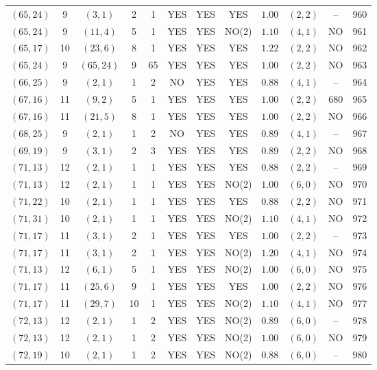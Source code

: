 \begin{longtable}{|c|c|c|c|c|c|c|c|c|c|c|c|}
$(65,24)$ & 9 & $(3,1)$ & 2 & 1 & YES & YES & YES & $1.00$ & $(2,2)$ & -- & 960\\
$(65,24)$ & 9 & $(11,4)$ & 5 & 1 & YES & YES & NO(2) & $1.10$ & $(4,1)$ & NO & 961\\
$(65,17)$ & 10 & $(23,6)$ & 8 & 1 & YES & YES & YES & $1.22$ & $(2,2)$ & NO & 962\\
$(65,24)$ & 9 & $(65,24)$ & 9 & 65 & YES & YES & YES & $1.00$ & $(2,2)$ & NO & 963\\
$(66,25)$ & 9 & $(2,1)$ & 1 & 2 & NO & YES & YES & $0.88$ & $(4,1)$ & -- & 964\\
$(67,16)$ & 11 & $(9,2)$ & 5 & 1 & YES & YES & YES & $1.00$ & $(2,2)$ & 680 & 965\\
$(67,16)$ & 11 & $(21,5)$ & 8 & 1 & YES & YES & YES & $1.00$ & $(2,2)$ & NO & 966\\
$(68,25)$ & 9 & $(2,1)$ & 1 & 2 & NO & YES & YES & $0.89$ & $(4,1)$ & -- & 967\\
$(69,19)$ & 9 & $(3,1)$ & 2 & 3 & YES & YES & YES & $0.89$ & $(2,2)$ & NO & 968\\
$(71,13)$ & 12 & $(2,1)$ & 1 & 1 & YES & YES & YES & $0.88$ & $(2,2)$ & -- & 969\\
$(71,13)$ & 12 & $(2,1)$ & 1 & 1 & YES & YES & NO(2) & $1.00$ & $(6,0)$ & NO & 970\\
$(71,22)$ & 10 & $(2,1)$ & 1 & 1 & YES & YES & YES & $0.88$ & $(2,2)$ & NO & 971\\
$(71,31)$ & 10 & $(2,1)$ & 1 & 1 & YES & YES & NO(2) & $1.10$ & $(4,1)$ & NO & 972\\
$(71,17)$ & 11 & $(3,1)$ & 2 & 1 & YES & YES & YES & $1.00$ & $(2,2)$ & -- & 973\\
$(71,17)$ & 11 & $(3,1)$ & 2 & 1 & YES & YES & NO(2) & $1.20$ & $(4,1)$ & NO & 974\\
$(71,13)$ & 12 & $(6,1)$ & 5 & 1 & YES & YES & NO(2) & $1.00$ & $(6,0)$ & NO & 975\\
$(71,17)$ & 11 & $(25,6)$ & 9 & 1 & YES & YES & YES & $1.00$ & $(2,2)$ & NO & 976\\
$(71,17)$ & 11 & $(29,7)$ & 10 & 1 & YES & YES & NO(2) & $1.10$ & $(4,1)$ & NO & 977\\
$(72,13)$ & 12 & $(2,1)$ & 1 & 2 & YES & YES & NO(2) & $0.89$ & $(6,0)$ & -- & 978\\
$(72,13)$ & 12 & $(2,1)$ & 1 & 2 & YES & YES & NO(2) & $1.00$ & $(6,0)$ & NO & 979\\
$(72,19)$ & 10 & $(2,1)$ & 1 & 2 & YES & YES & NO(2) & $0.88$ & $(6,0)$ & -- & 980\\

\end{longtable}
